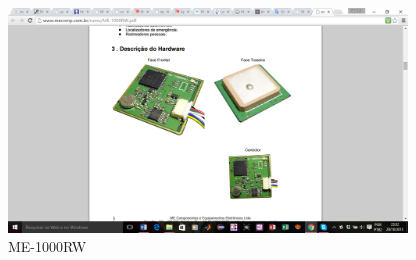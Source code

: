 \begin{figure}[h]
  \centering
  \includegraphics[width=400px, scale=1]{figuras/gps_me1000}
  \caption{ME-1000RW \cite{11gps}}
\label{fig:gps_me1000}
\end{figure}
